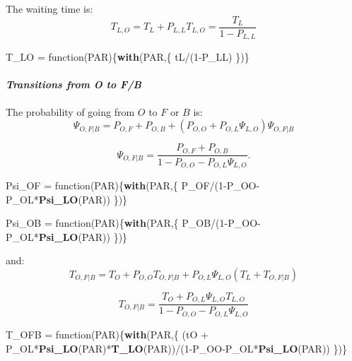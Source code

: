 \documentclass[]{article}
\newenvironment{Shaded}{\begin{snugshade}}{\end{snugshade}}
\newcommand{\KeywordTok}[1]{\textcolor[rgb]{0.13,0.29,0.53}{\textbf{{#1}}}}
\newcommand{\DecValTok}[1]{\textcolor[rgb]{0.00,0.00,0.81}{{#1}}}
\newcommand{\StringTok}[1]{\textcolor[rgb]{0.31,0.60,0.02}{{#1}}}
\newcommand{\NormalTok}[1]{{#1}}
\let\oldparagraph\paragraph
\renewcommand{\paragraph}[1]{\oldparagraph{#1}\mbox{}}
\begin{document}
The waiting time is:
\[T_{L,O}  = T_L + P_{L,L} T_{L,O} = \frac{T_L}{1-P_{L,L}} \]

\begin{Shaded}
\begin{Highlighting}[]
\NormalTok{T_LO =}\StringTok{ }\NormalTok{function(PAR)\{}\KeywordTok{with}\NormalTok{(PAR,\{}
  \NormalTok{tL/(}\DecValTok{1}\NormalTok{-P_LL)}
\NormalTok{\})\}}
\end{Highlighting}
\end{Shaded}

\paragraph{\texorpdfstring{\emph{Transitions from O to
F/B}}{Transitions from O to F/B}}\label{transitions-from-o-to-fb}

The probability of going from \(O\) to \(F\) or \(B\) is:
\[\Psi_{O,F|B} = P_{O,F} + P_{O,B} + \left(P_{O,O} + P_{O,L} \Psi_{L,O} \right) \Psi_{O,F|B} \]

\[ \Psi_{O,F|B} = \frac{P_{O,F}+ P_{O,B}}{1-P_{O,O} - P_{O,L} \Psi_{L,O}}.\]

\begin{Shaded}
\begin{Highlighting}[]
\NormalTok{Psi_OF =}\StringTok{ }\NormalTok{function(PAR)\{}\KeywordTok{with}\NormalTok{(PAR,\{}
  \NormalTok{P_OF/(}\DecValTok{1}\NormalTok{-P_OO-P_OL*}\KeywordTok{Psi_LO}\NormalTok{(PAR))}
\NormalTok{\})\}}

\NormalTok{Psi_OB =}\StringTok{ }\NormalTok{function(PAR)\{}\KeywordTok{with}\NormalTok{(PAR,\{}
  \NormalTok{P_OB/(}\DecValTok{1}\NormalTok{-P_OO-P_OL*}\KeywordTok{Psi_LO}\NormalTok{(PAR))}
\NormalTok{\})\}}
\end{Highlighting}
\end{Shaded}

and: \[ 
T_{O,F|B} = T_O + P_{O,O} T_{O,F|B} + P_{O,L} \Psi_{L,O} \left(T_L + T_{O,F|B} \right)
\]

\[ 
T_{O,F|B}= \frac{T_O  + P_{O,L} \Psi_{L,O} T_{L,O}}{1 - P_{O,O} - P_{O,L} \Psi_{L,O}}
\]

\begin{Shaded}
\begin{Highlighting}[]
\NormalTok{T_OFB =}\StringTok{ }\NormalTok{function(PAR)\{}\KeywordTok{with}\NormalTok{(PAR,\{}
  \NormalTok{(tO +}\StringTok{ }\NormalTok{P_OL*}\KeywordTok{Psi_LO}\NormalTok{(PAR)*}\KeywordTok{T_LO}\NormalTok{(PAR))/(}\DecValTok{1}\NormalTok{-P_OO-P_OL*}\KeywordTok{Psi_LO}\NormalTok{(PAR))}
\NormalTok{\})\}}
\end{Highlighting}
\end{Shaded}
\end{document}

